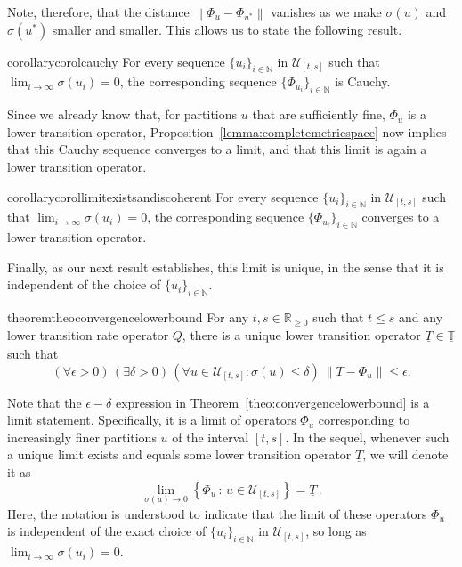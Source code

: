 \documentclass[10pt,a4paper]{paper}
\theoremstyle{definition}
\newcommand{\nats}{\mathbb{N}}
\newcommand{\reals}{\mathbb{R}}
\newcommand{\realsnonneg}{\reals_{\geq 0}}
\newcommand{\lt}{\underline{T}}
\newcommand{\lrate}{\underline{Q}}
\newcommand{\norm}[1]{\left\lVert #1 \right\rVert}
\begin{document}
Note, therefore, that the distance $\norm{\Phi_u - \Phi_{u^*}}$ vanishes as we make $\sigma(u)$ and $\sigma(u^*)$ smaller and smaller. This allows us to state the following result.

\begin{restatable}{corollary}{corolcauchy}
\label{corol:cauchy}
For every sequence $\{u_i\}_{i\in\nats}$ in $\mathcal{U}_{[t,s]}$ such that $\lim_{i\to\infty}\sigma(u_i)=0$, the corresponding sequence $\{\Phi_{u_i}\}_{i\in\nats}$ is Cauchy.
\end{restatable}

Since we already know that, for partitions $u$ that are sufficiently fine, $\Phi_u$ is a lower transition operator, Proposition~\ref{lemma:completemetricspace} now implies that this Cauchy sequence converges to a limit, and that this limit is again a lower transition operator.

\begin{restatable}{corollary}{corollimitexistsandiscoherent}
\label{corol:limitexistsandiscoherent}
For every sequence $\{u_i\}_{i\in\nats}$ in $\mathcal{U}_{[t,s]}$ such that $\lim_{i\to\infty}\sigma(u_i)=0$, the corresponding sequence $\{\Phi_{u_i}\}_{i\in\nats}$ converges to a lower transition operator.
\end{restatable}

Finally, as our next result establishes, this limit is unique, in the sense that it is independent of the choice of $\{u_i\}_{i\in\nats}$.

\begin{restatable}{theorem}{theoconvergencelowerbound}
\label{theo:convergencelowerbound}
For any $t,s\in\realsnonneg$ such that $t\leq s$ and any lower transition rate operator $\lrate$, there is a unique lower transition operator $\lt\in\underline{\mathbb{T}}$ such that 
\begin{equation}\label{eq:theo:convergencelowerbound}
(\forall\epsilon>0)\,
(\exists\delta>0)\,
(\forall u\in\mathcal{U}_{[t,s]}\colon\sigma(u)\leq\delta)~\norm{\lt - \Phi_u}\leq\epsilon.
\end{equation}
\end{restatable}

Note that the $\epsilon-\delta$ expression in Theorem~\ref{theo:convergencelowerbound} is a limit statement. Specifically, it is a limit of operators $\Phi_{u}$ corresponding to increasingly finer partitions $u$ of the interval $[t,s]$. In the sequel, whenever such a unique limit exists and equals some lower transition operator $\lt$, we will denote it as
\begin{equation}\label{eq:net_limit_lower_trans}
\lim_{\sigma(u)\to0}\left\{\Phi_u\,\colon\,u\in\mathcal{U}_{[t,s]}\right\} = \lt\,.
\end{equation}
Here, the notation is understood to indicate that the limit of these operators $\Phi_{u}$ is independent of the exact choice of $\{u_i\}_{i\in\nats}$ in $\mathcal{U}_{[t,s]}$, so long as $\lim_{i\to\infty}\sigma(u_i)=0$.
\end{document}
